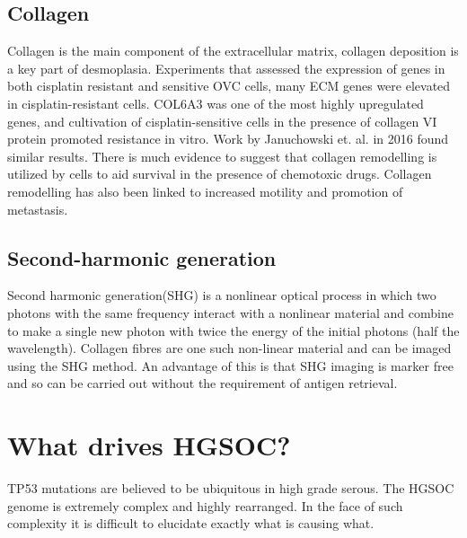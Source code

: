 \subsection{Collagen}
Collagen is the main component of the extracellular matrix, collagen deposition is a key part of desmoplasia. 
Experiments that assessed the expression of genes in both cisplatin resistant and sensitive OVC cells, many ECM genes were elevated in cisplatin-resistant cells. COL6A3 was one of the most highly upregulated genes, and cultivation of cisplatin-sensitive cells in the presence of collagen VI protein promoted resistance in vitro\cite{Sherman-Baust2003Apr}. Work by Januchowski et. al. in 2016 found similar results\cite{januchowski2016increased}. There is much evidence to suggest that collagen remodelling is utilized by cells to aid survival in the presence of chemotoxic drugs. Collagen remodelling has also been linked to increased motility and promotion of metastasis\cite{natarajan2019collagen}.

\subsection{Second-harmonic generation}

Second harmonic generation(SHG) is a nonlinear optical process in which two photons with the same frequency interact with a nonlinear material and combine to make a single new photon with twice the energy of the initial photons (half the wavelength). Collagen fibres are one such non-linear material and can be imaged using the SHG method. An advantage of this is that SHG imaging is marker free and so can be carried out without the requirement of antigen retrieval. 


\section{What drives HGSOC?} %

TP53 mutations are believed to be ubiquitous in high grade serous. The HGSOC genome is extremely complex and highly rearranged. In the face of such complexity it is difficult to elucidate exactly what is causing what.  \citep{RN17}



